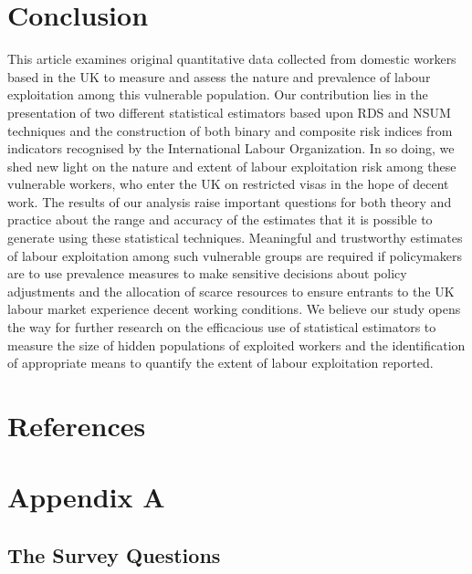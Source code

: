\documentclass[
  12pt,
  letterpaper,
  DIV=11,
  numbers=noendperiod]{scrartcl}
\theoremstyle{plain}
\theoremstyle{definition}
\begin{document}
\section{Conclusion}\label{conclusion}

This article examines original quantitative data collected from domestic
workers based in the UK to measure and assess the nature and prevalence
of labour exploitation among this vulnerable population. Our
contribution lies in the presentation of two different statistical
estimators based upon RDS and NSUM techniques and the construction of
both binary and composite risk indices from indicators recognised by the
International Labour Organization. In so doing, we shed new light on the
nature and extent of labour exploitation risk among these vulnerable
workers, who enter the UK on restricted visas in the hope of decent
work. The results of our analysis raise important questions for both
theory and practice about the range and accuracy of the estimates that
it is possible to generate using these statistical techniques.
Meaningful and trustworthy estimates of labour exploitation among such
vulnerable groups are required if policymakers are to use prevalence
measures to make sensitive decisions about policy adjustments and the
allocation of scarce resources to ensure entrants to the UK labour
market experience decent working conditions. We believe our study opens
the way for further research on the efficacious use of statistical
estimators to measure the size of hidden populations of exploited
workers and the identification of appropriate means to quantify the
extent of labour exploitation reported.

\newpage

\newpage

\section{References}\label{references}

\printbibliography[heading=none]

\newpage

\appendix

\newpage

\section{Appendix A}\label{app-survey}

\subsection{The Survey Questions}\label{the-survey-questions}
\end{document}
